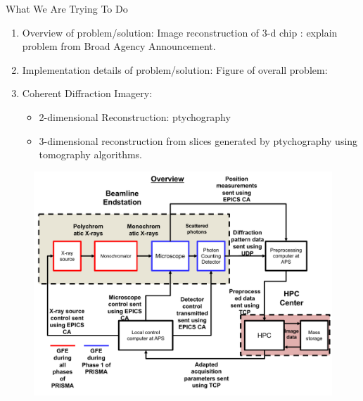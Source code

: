 \begin{frame}{What We Are Trying To Do}
\begin{enumerate} 
\item Overview of problem/solution: Image reconstruction of 3-d chip : explain problem from Broad Agency Announcement. 
\item Implementation details of problem/solution: Figure of overall problem: 
\item Coherent Diffraction Imagery:  
\begin{itemize} 
\small \item \small 2-dimensional Reconstruction:  ptychography 
\item \small 3-dimensional reconstruction from slices generated by ptychography using tomography algorithms. 
\end{itemize} 
\end{enumerate}
\begin{figure}[ht!]
\includegraphics[scale=0.22]{./images/exp_schematic_1017_1}
\end{figure} 
\end{frame}

